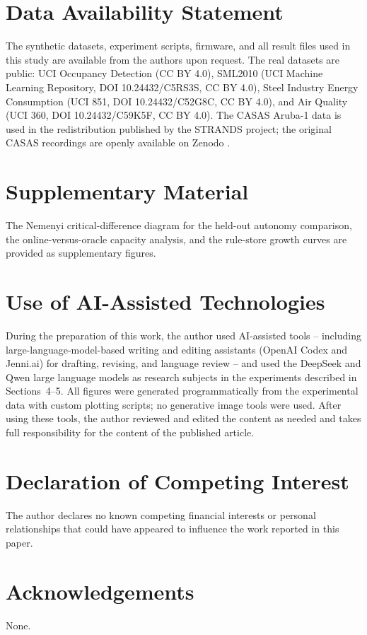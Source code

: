 \documentclass[review]{elsarticle}
\begin{document}
\section*{Data Availability Statement}
The synthetic datasets, experiment scripts, firmware, and all result files
used in this study are available from the authors upon request.
The real datasets are public: UCI Occupancy Detection (CC BY 4.0), SML2010
(UCI Machine Learning Repository, DOI 10.24432/C5RS3S, CC BY 4.0), Steel
Industry Energy Consumption (UCI 851, DOI 10.24432/C52G8C, CC BY 4.0), and
Air Quality (UCI 360, DOI 10.24432/C59K5F, CC BY 4.0). The CASAS Aruba-1
data is used in the redistribution published by the STRANDS project; the
original CASAS recordings are openly available on Zenodo \cite{32}.

\section*{Supplementary Material}
The Nemenyi critical-difference diagram for the held-out autonomy comparison,
the online-versus-oracle capacity analysis, and the rule-store growth curves
are provided as supplementary figures.

\section*{Use of AI-Assisted Technologies}
During the preparation of this work, the author used AI-assisted tools --
including large-language-model-based writing and editing assistants (OpenAI
Codex and Jenni.ai) for drafting, revising, and language review -- and used
the DeepSeek and Qwen large language models as research subjects in the
experiments described in Sections~4--5. All figures were generated
programmatically from the experimental data with custom plotting scripts;
no generative image tools were used. After using these tools, the author
reviewed and edited the content as needed and takes full responsibility for
the content of the published article.

\section*{Declaration of Competing Interest}
The author declares no known competing financial interests or personal
relationships that could have appeared to influence the work reported in this
paper.

\section*{Acknowledgements}
None.
\end{document}
